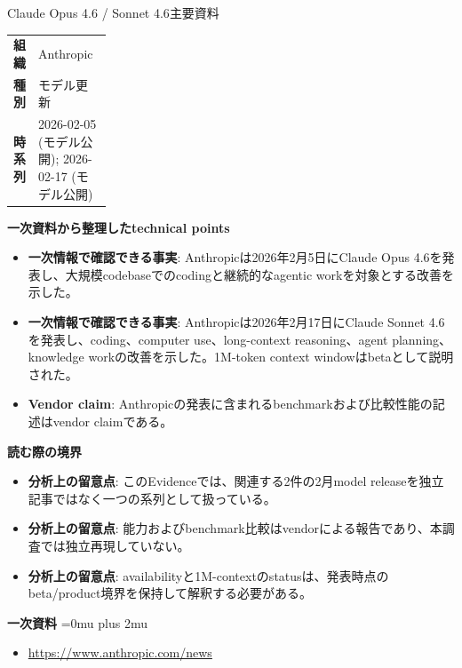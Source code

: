 \begin{technicalnote}{Claude Opus 4.6 / Sonnet 4.6}{主要資料}
\begingroup
\begin{tabularx}{\linewidth}{@{}>{\bfseries}p{0.22\linewidth}X@{}}
組織 & Anthropic \\
種別 & モデル更新 \\
時系列 & 2026-02-05 (モデル公開); 2026-02-17 (モデル公開) \\
\end{tabularx}
\smallskip
{\bfseries 一次資料から整理したtechnical points}
\begin{itemize}[leftmargin=1.5em,itemsep=0.35em]
\item \textbf{一次情報で確認できる事実}: Anthropicは2026年2月5日にClaude Opus 4.6を発表し、大規模codebaseでのcodingと継続的なagentic workを対象とする改善を示した。
\item \textbf{一次情報で確認できる事実}: Anthropicは2026年2月17日にClaude Sonnet 4.6を発表し、coding、computer use、long-context reasoning、agent planning、knowledge workの改善を示した。1M-token context windowはbetaとして説明された。
\item \textbf{Vendor claim}: Anthropicの発表に含まれるbenchmarkおよび比較性能の記述はvendor claimである。
\end{itemize}
\begin{minipage}{\linewidth}
{\bfseries 読む際の境界}
\begin{itemize}[leftmargin=1.5em,itemsep=0.35em]
\item \textbf{分析上の留意点}: このEvidenceでは、関連する2件の2月model releaseを独立記事ではなく一つの系列として扱っている。
\item \textbf{分析上の留意点}: 能力およびbenchmark比較はvendorによる報告であり、本調査では独立再現していない。
\item \textbf{分析上の留意点}: availabilityと1M-contextのstatusは、発表時点のbeta/product境界を保持して解釈する必要がある。
\end{itemize}
\begin{samepage}
{\bfseries 一次資料}
\begingroup\sloppy
\Urlmuskip=0mu plus 2mu\relax
\begin{itemize}[leftmargin=1.5em,itemsep=0.25em]
\item {\scriptsize\url{https://www.anthropic.com/news}}
\end{itemize}
\endgroup
\end{samepage}
\end{minipage}
\endgroup
\end{technicalnote}
\medskip
